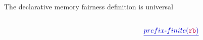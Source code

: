 \newcommand{\fakeTheoremOneline}[1]{
  #1
}
\newcommand{\fakeTheoremOnelineN}[2]{
  {\color{\colorTitleApprox}\large \textit{Theorem #1.}} #2
}

\newcommand{\thmLine}[3]{${\color{\colorTitleApprox}\large \textit{Theorem #1.}}$ & $#2$ & $\equiv$ & $#3 \cap \fairDecl$}

\begin{frame}{The declarative memory fairness definition is universal}

  \begin{columns}
    
    \begin{column}{0.45\linewidth}
      \begin{center}
        \propSubtrace
      \end{center}    
    \end{column}

    \begin{column}{0.05\linewidth}
      \raisebox{-0.5cm}{\LARGE $\approx$}
    \end{column}
    
    \begin{column}{0.40\linewidth}
      \begin{center}
        ${\color{\colorTitleApprox}\underline{prefix\text{-}finite(\lFR)}}$
      \end{center}
    \end{column}      

  \end{columns}
  
  \vspace{0.5cm}
  \pause



\end{frame}
